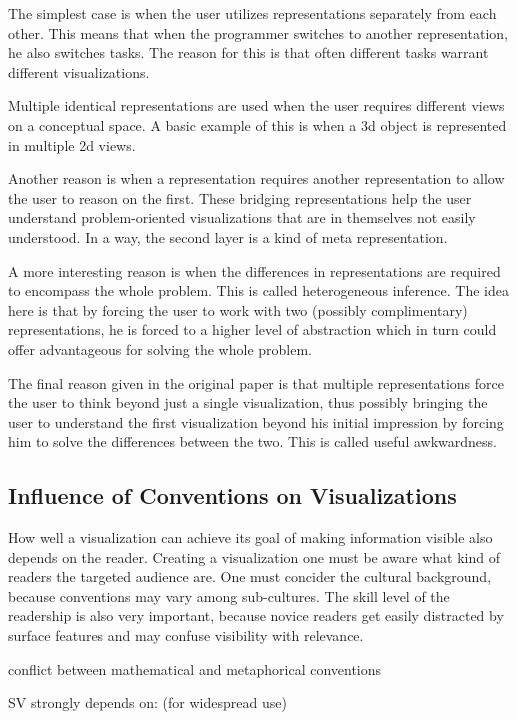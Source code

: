 \documentclass[11pt, a4paper, ngerman, twoside]{article}
\theoremstyle{plain}\newtheorem{Lemma}{Lemma}
\theoremstyle{plain}\newtheorem{Satz}[Lemma]{Satz}
\theoremstyle{definition}\newtheorem{Definition}[Lemma]{Definition}
\theoremstyle{definition}\newtheorem*{Beispiel}{Beispiel}
\theoremstyle{remark}\newtheorem*{Bemerkung}{Bemerkung}
\begin{document}
The simplest case is when the user utilizes representations separately from each other. This means that when the programmer switches to another representation, he also switches tasks. The reason for this is that often different tasks warrant different visualizations.

Multiple identical representations are used when the user requires different views on a conceptual space. A basic example of this is when a 3d object is represented in multiple 2d views.

Another reason is when a representation requires another representation to allow the user to reason on the first. These bridging representations help the user understand problem-oriented visualizations that are in themselves not easily understood. In a way, the second layer is a kind of meta representation.

A more interesting reason is when the differences in representations are required to encompass the whole problem. This is called heterogeneous inference. The idea here is that by forcing the user to work with two (possibly complimentary) representations, he is forced to a higher level of abstraction which in turn could offer advantageous for solving the whole problem.

The final reason given in the original paper is that multiple representations force the user to think beyond just a single visualization, thus possibly bringing the user to understand the first visualization beyond his initial impression by forcing him to solve the differences between the two. This is called useful awkwardness.

\subsection{Influence of Conventions on Visualizations}

How well a visualization can achieve its goal of making information visible also depends on the reader. Creating a visualization one must be aware what kind of readers the targeted audience are. One must concider the cultural background, because conventions may vary among sub-cultures. The skill level of the readership is also very important, because novice readers get easily distracted by surface features and may confuse visibility with relevance.


conflict between mathematical and metaphorical conventions

SV strongly depends on: (for widespread use)
\end{document}
